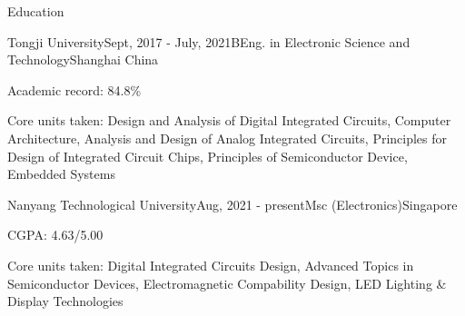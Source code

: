 \documentclass{resume} %
\begin{document}

\begin{rSection}{Education}
	
	\begin{rSubsection}{Tongji University}{Sept, 2017 - July, 2021}{BEng. in Electronic Science and Technology}{Shanghai China}
		\item Academic record: 84.8\% 
		\item Core units taken: Design and Analysis of Digital Integrated Circuits, Computer Architecture, Analysis and Design of Analog Integrated Circuits, Principles for Design of Integrated Circuit Chips, Principles of Semiconductor Device, Embedded Systems
	\end{rSubsection}

	\begin{rSubsection}{Nanyang Technological University}{Aug, 2021 - present}{Msc (Electronics)}{Singapore}
		\item CGPA: 4.63/5.00
		\item Core units taken: Digital Integrated Circuits Design, Advanced Topics in Semiconductor Devices, Electromagnetic Compability Design, LED Lighting \& Display Technologies
	\end{rSubsection}

\end{rSection}
\end{document}
